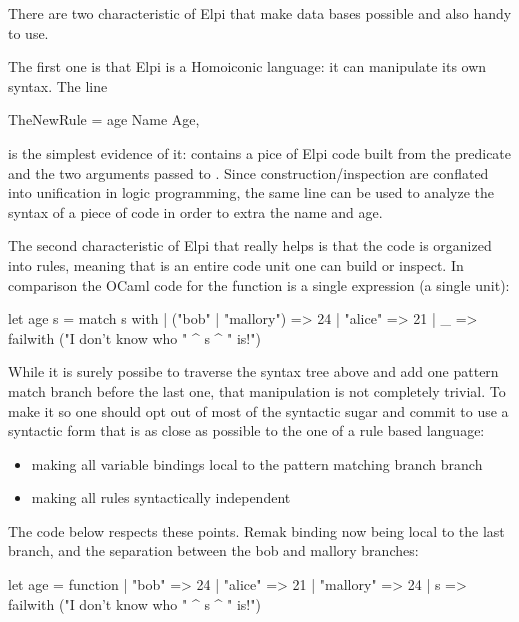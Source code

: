 \documentclass[a4paper, 11pt]{book}
\begin{document}
There are two characteristic of Elpi that make data bases possible and also
handy to use.

The first one is that Elpi is a Homoiconic language: it can manipulate its own
syntax. The line

\begin{elpicode}
TheNewRule = age Name Age,
\end{elpicode}

is the simplest evidence of it:  contains a pice
of Elpi code built from the  predicate and the two arguments
passed to . Since construction/inspection are conflated
into unification in logic programming, the same line can be used to analyze the
syntax of a piece of code in order to extra the name and age.

The second characteristic of Elpi that really helps is that the code is
organized into rules, meaning that  is an entire code
unit one can build or inspect. In comparison the OCaml code for the
 function is a single expression (a single unit):

\begin{ocamlcode}
let age s =
  match s with
  | ("bob" | "mallory") => 24
  | "alice" => 21
  | _ => failwith ("I don't know who " ^ s ^ " is!")
\end{ocamlcode}

While it is surely possibe to traverse the syntax tree above and add one
pattern match branch before the last one, that manipulation is not completely
trivial. To make it so one should opt out of most of the syntactic sugar and
commit to use a syntactic form that is as close as possible to the one
of a rule based language:
\begin{itemize}
  \item making all variable bindings local to the pattern matching branch branch
  \item making all rules syntactically independent
\end{itemize}

The code below respects these points. Remak  binding now
being local to the last branch, and the separation between the bob and
mallory branches:

\begin{ocamlcode}
let age = function
  | "bob" => 24
  | "alice" => 21
  | "mallory" => 24
  | s => failwith ("I don't know who " ^ s ^ " is!")
\end{ocamlcode}
  
\end{document}
